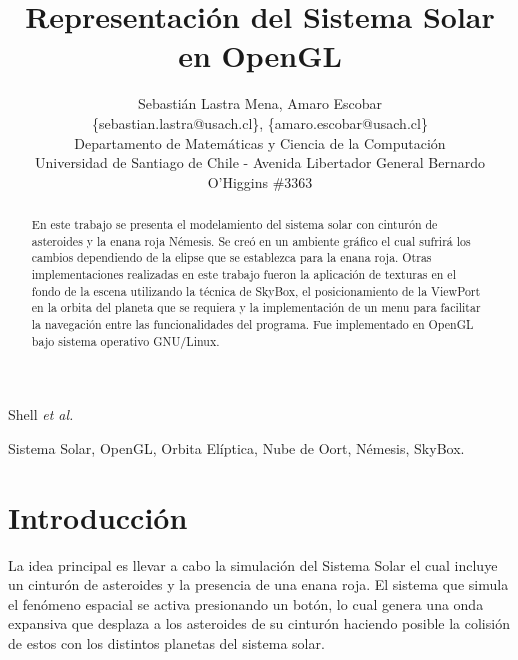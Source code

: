 \documentclass[journal]{IEEEtran}
\begin{document}
\title{Representación del Sistema Solar en OpenGL}

\author{Sebastián Lastra Mena, Amaro Escobar\\ \{sebastian.lastra@usach.cl\}, \{amaro.escobar@usach.cl\}\\Departamento de Matemáticas y Ciencia de la Computación \\ Universidad de Santiago de Chile - Avenida Libertador General Bernardo O'Higgins \#3363 
}

{Shell \MakeLowercase{\textit{et al.}}}

\maketitle

\begin{abstract}
	En este trabajo se presenta el modelamiento del sistema solar con cinturón de asteroides y la enana roja 	Némesis. Se creó en un ambiente gráfico el cual sufrirá los cambios dependiendo de la elipse que se establezca para la enana roja. Otras implementaciones realizadas en este trabajo fueron la aplicación de texturas en el fondo de la escena utilizando la técnica de SkyBox, el posicionamiento de la ViewPort en la orbita del planeta que se requiera y la implementación de un menu para facilitar la navegación entre las funcionalidades del programa. Fue implementado en OpenGL bajo sistema operativo GNU/Linux.
\end{abstract}

\begin{keywords}
	Sistema Solar, OpenGL, Orbita Elíptica, Nube de Oort, Némesis, SkyBox.
\end{keywords}

\IEEEpeerreviewmaketitle

\section{Introducción}

	La idea principal es llevar a cabo la simulación del Sistema Solar el cual incluye un cinturón de asteroides y la presencia de una enana roja. El sistema que simula el fenómeno espacial se activa presionando un botón, lo cual genera una onda expansiva que desplaza a los asteroides de su cinturón haciendo posible la colisión de estos con los distintos planetas del sistema solar.
\end{document}
